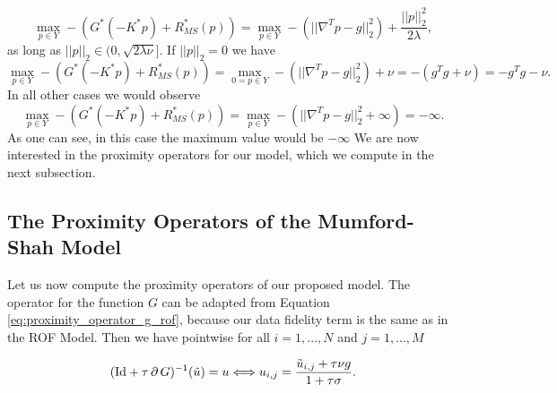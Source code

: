             $$
                \max_{p \in Y} - (G^{\ast}(-K^{\ast}p) + R_{MS}^{\ast}(p)) = \max_{p \in Y} -(||\nabla^{T}p - g||_{2}^{2}) + \frac{||p||_{2}^{2}}{2\lambda},
            $$
        as long as $||p||_{2} \in (0, \sqrt{2 \lambda \nu}]$. If $||p||_{2} = 0$ we have
            $$
                \max_{p \in Y} - (G^{\ast}(-K^{\ast}p) + R_{MS}^{\ast}(p)) = \max_{0 = p \in Y} -(||\nabla^{T}p - g||_{2}^{2}) + \nu = -(g^{T}g + \nu) = -g^{T}g - \nu.
            $$
        In all other cases we would observe
            $$
                \max_{p \in Y} - (G^{\ast}(-K^{\ast}p) + R_{MS}^{\ast}(p)) = \max_{p \in Y} -(||\nabla^{T}p - g||_{2}^{2} + \infty) = -\infty.
            $$
        As one can see, in this case the maximum value would be $- \infty$
        We are now interested in the proximity operators for our model, which we compute in the next subsection.


    \subsection{The Proximity Operators of the Mumford-Shah Model} %
    \label{sub:the_proximity_operators_of_the_mumford_shah_model}
        
        Let us now compute the proximity operators of our proposed model. The operator for the function $G$ can be adapted from Equation \ref{eq:proximity_operator_g_rof}, because our data fidelity term is the same as in the ROF Model. Then we have pointwise for all $i = 1, ..., N$ and $j = 1, ..., M$

            \begin{equation}
                (\textnormal{Id} + \tau\,\partial\,G)^{-1}(\tilde{u}) = u \Longleftrightarrow u_{i,j} = \frac{\tilde{u}_{i,j} + \tau\nu g}{1 + \tau\sigma}.
            \label{eq:proximity_operator_g_mumford_shah}
            \end{equation}

